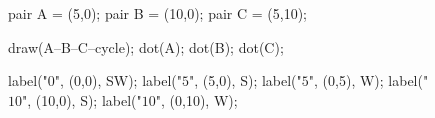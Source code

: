 \documentclass[../gatm.tex]{subfiles}
\begin{document}
\begin{figure}[h]
\begin{center}
\begin{minipage}[c]{0.35\textwidth}
\begin{center}
\begin{minipage}[b]{\textwidth}
\begin{asy}[width=0.7\textwidth]
						pair A = (5,0);
						pair B = (10,0);
						pair C = (5,10);
						
						draw(A--B--C--cycle);
						dot(A);
						dot(B);
						dot(C);
						
						label("$0$", (0,0), SW);
						label("$5$", (5,0), S);
						label("$5$", (0,5), W);
						label("$10$", (10,0), S);
						label("$10$", (0,10), W);
					\end{asy}
				\end{minipage}
			\end{center}
			\vspace*{-2\baselineskip}
			\begin{center}
				\begin{minipage}[t]{\textwidth}
					\label{fig:preimage_tri}
				\end{minipage}
			\end{center}
		\end{minipage}
	\end{center}
\end{figure}

\pagebreak
\end{document}
